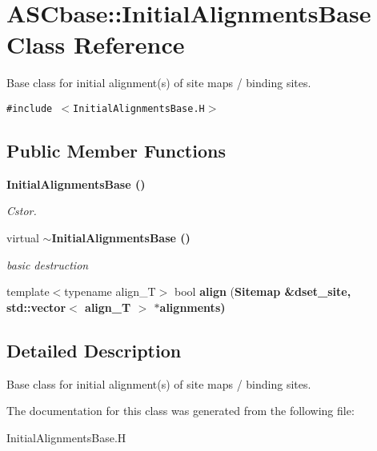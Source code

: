 \section{ASCbase::Initial\-Alignments\-Base Class Reference}
\label{classASCbase_1_1InitialAlignmentsBase}
Base class for initial alignment(s) of site maps / binding sites.  


{\tt \#include $<$Initial\-Alignments\-Base.H$>$}

\subsection*{Public Member Functions}
\begin{CompactItemize}
\item 
\bf{Initial\-Alignments\-Base} ()\label{classASCbase_1_1InitialAlignmentsBase_5980fc0808725ed85537211cb846a527}

\begin{CompactList}\small\item\em Cstor. \item\end{CompactList}\item 
virtual \bf{$\sim$Initial\-Alignments\-Base} ()\label{classASCbase_1_1InitialAlignmentsBase_2bf277ae7d263c8116508e5e440c1896}

\begin{CompactList}\small\item\em basic destruction \item\end{CompactList}\item 
template$<$typename align\_\-T$>$ bool \textbf{align} (\bf{Sitemap} \&dset\_\-site, std::vector$<$ align\_\-T $>$ $\ast$alignments)\label{classASCbase_1_1InitialAlignmentsBase_7cfb90c844039c31f14e07fb3d814bb5}

\end{CompactItemize}


\subsection{Detailed Description}
Base class for initial alignment(s) of site maps / binding sites. 



The documentation for this class was generated from the following file:\begin{CompactItemize}
\item 
Initial\-Alignments\-Base.H\end{CompactItemize}
